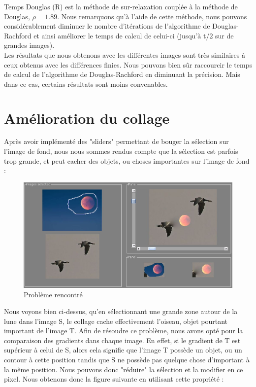 \newline 
Temps Douglas (R) est la méthode de sur-relaxation couplée à la méthode de Douglas, $\rho = 1.89$. Nous remarquons qu'à l'aide de cette méthode, nous pouvons considérablement diminuer le nombre d'itérations de l'algorithme de Douglas-Rachford et ainsi améliorer le temps de calcul de celui-ci (jusqu'à t/2 sur de grandes images).\\
Les résultats que nous obtenons avec les différentes images sont très similaires à ceux obtenus avec les différences finies. Nous pouvons bien sûr raccourcir le temps de calcul de l'algorithme de Douglas-Rachford en diminuant la précision. Mais dans ce cas, certains résultats sont moins convenables.
\section{Amélioration du collage}
Après avoir implémenté des "sliders" permettant de bouger la sélection sur l'image de fond, nous nous sommes rendus compte que la sélection est parfois trop grande, et peut cacher des objets, ou choses importantes sur l'image de fond : 
\begin{figure}[!htb]
\centering
\includegraphics[scale=0.25]{Images/pb.png}
\caption{Problème rencontré}
\end{figure}
Nous voyons bien ci-dessus, qu'en sélectionnant une grande zone autour de la lune dans l'image S, le collage cache effectivement l'oiseau, objet pourtant important de l'image T. Afin de résoudre ce problème, nous avons opté pour la comparaison des gradients dans chaque image. En effet, si le gradient de T est supérieur à celui de S, alors cela signifie que l'image T possède un objet, ou un contour à cette position tandis que S ne possède pas quelque chose d'important à la même position. Nous pouvons donc "réduire" la sélection et la modifier en ce pixel. Nous obtenons donc la figure suivante en utilisant cette propriété :
